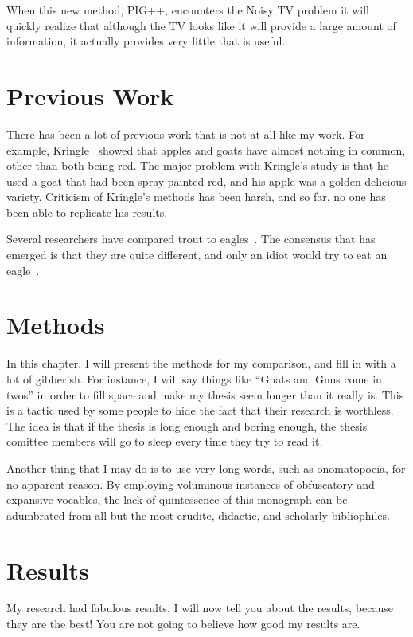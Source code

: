 \documentclass[12pt]{thesis}
\begin{document}
When this new method, PIG++, encounters the Noisy TV problem it will quickly realize that although the TV looks like it will provide a large amount of information, it actually provides very little that is useful.

\chapter{Previous Work}


There has been a lot of previous work that is not at all like my work.
For example,
\ifthesiscitations
{} %
\else
Kringle~\cite{Kringle} %
\fi
showed that apples and goats have almost
nothing in common, other than both being red.  The major problem with
Kringle's study is that he used a goat that had been spray painted
red, and his apple was a golden delicious variety.  Criticism of
Kringle's methods has been harsh, and so far, no one has been able to
replicate his results.

Several researchers have compared trout to
eagles~\cite{Simmons,Sheppard}.  The consensus that has emerged is
that they are quite different, and only an idiot would try to eat an
eagle~\cite{Idiot}.

\chapter{Methods}
In this chapter, I will present the methods for my comparison, and
fill in with a lot of gibberish.  For instance, I will say things like
``Gnats and Gnus come in twos'' in order to fill space and make my
thesis seem longer than it really is.  This is a tactic used by some
people to hide the fact that their research is worthless.  The idea is
that if the thesis is long enough and boring enough, the thesis
comittee members will go to sleep every time they try to read it.

Another thing that I may do is to use very long words, such as
onomatopoeia, for no apparent reason.  By employing voluminous
instances of obfuscatory and expansive vocables, the lack of
quintessence of this monograph can be adumbrated from all but
the most erudite, didactic, and scholarly bibliophiles.


\chapter{Results}
My research had fabulous results. I will now tell you about
the results, because they are the best!  You are not going
to believe how good my results are.
\end{document}
